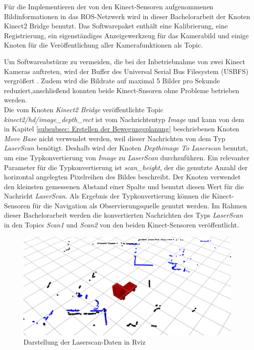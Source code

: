 		    	Für die Implementieren der von den Kinect-Sensoren aufgenommenen Bildinformationen in das ROS-Netzwerk wird in dieser Bachelorarbeit der Knoten \glqq Kinect2 Bridge\grqq{} benutzt. Das Softwarepaket enthält eine Kalibrierung, eine Registrierung, ein eigenständiges Anzeigewerkzeug für das Kamerabild und einige Knoten für die Veröffentlichung aller Kamerafunktionen als Topic. 
		    	
		    	Um Softwareabstürze zu vermeiden, die bei der Inbetriebnahme von zwei Kinect Kameras auftreten, wird der Buffer des Universal Serial Bus Filesystem (USBFS) vergrößert \cite{libfreenect2troubleshooting}.
		    	Zudem wird die Bildrate auf maximal 5 Bilder pro Sekunde reduziert,anschließend konnten beide Kinect-Snsoren ohne Probleme betrieben werden. \cite{iaikinect}\\
		   		    
		    	Die vom Knoten \textit{Kinect2 Bridge} veröffentlichte Topic \textit{kinect2/hd/image\_depth\_rect} ist vom Nachrichtentyp \textit{Image }und kann von dem in Kapitel \ref{subsubsec: Erstellen der Bewegungsplanung} beschriebenen Knoten \textit{Move Base} nicht verwendet werden, weil dieser Nachrichten von dem Typ \textit{LaserScan} benötigt.
			    Deshalb wird der Knoten \textit{Depthimage To Laserscan} benutzt, um eine Typkonvertierung von \textit{Image} zu \textit{ LaserScan} durchzuführen.
		    	Ein relevanter Parameter für die Typkonvertierung ist \textit{scan\_height}, der die genutzte Anzahl der horizontal angelegten Pixelreihen des Bildes beschreibt. Der Knoten verwendet den kleinsten gemessenen Abstand einer Spalte und benutzt diesen Wert für die Nachricht \textit{LaserScan}.
		    	Als Ergebnis der Typkonvertierung können die Kinect-Sensoren für die Navigation als Observierungsquelle genutzt werden.
		    	 Im Rahmen dieser Bachelorarbeit werden die konvertierten Nachrichten des Typs \textit{LaserScan} in den Topics \textit{Scan1} und \textit{Scan2} von den beiden Kinect-Sensoren veröffentlicht. \cite{depthimagetolaserscan}
		    	
		   
		     	\begin{figure}[H]
		     		\centering
		     		\includegraphics[width=1.0\textwidth]{Bilder/lidarundkinect.png}
		     		\caption{Darstellung der Laserscan-Daten in Rviz}
		     		\label{fig: Laserscans in Rviz}
		     	\end{figure}
		     	
